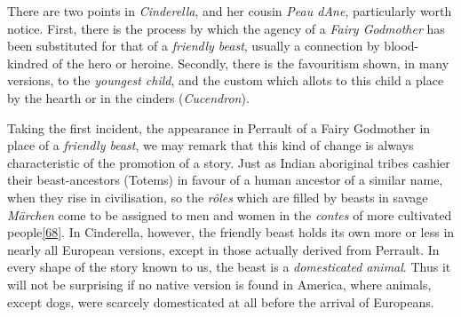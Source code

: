 \documentclass[14pt,a4paper]{memoir}
\begin{document}
There are two points in \emph{Cinderella}, and her cousin \emph{Peau
d\textquotesingle Ane}, particularly worth notice. First, there is the
process by which the agency of a \emph{Fairy Godmother} has been
substituted for that of a \emph{friendly beast}, usually a connection by
blood-kindred of the hero or heroine. Secondly, there is the favouritism
shown, in many versions, to the \emph{youngest child}, and the custom
which allots to this child a place by the hearth or in the cinders
(\emph{Cucendron}).

Taking the first incident, the appearance in Perrault of a Fairy
Godmother in place of a \emph{friendly beast}, we may remark that this
kind of change is always characteristic of the promotion of a story.
Just as Indian \textquotesingle aboriginal\textquotesingle{} tribes
cashier their beast-ancestors (\textquotesingle Totems\textquotesingle)
in favour of a human ancestor of a similar name, when they rise in
civilisation, so the \emph{rôles} which are filled by beasts in savage
\emph{Märchen} come to be assigned to men and women in the \emph{contes}
of more cultivated
people\protect\hypertarget{4533318093929944247_33931-h-1.htm.xhtmlux5cux23FNanchor_68}{}{}\protect\hyperlink{4533318093929944247_33931-h-1.htm.xhtmlux5cux23Footnote_68}{{[}68{]}}.
In Cinderella, however, the friendly beast holds its own more or less in
nearly all European versions, except in those actually derived from
Perrault. In every shape of the story known to us, the beast is a
\emph{domesticated animal}. Thus it will not be surprising if no native
version is found in America, where animals, except dogs, were scarcely
domesticated at all before the arrival of Europeans.
\end{document}
